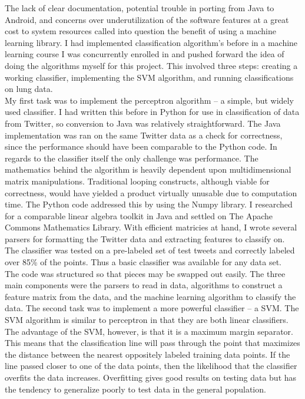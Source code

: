 \documentclass{article}
\begin{document}
 The lack of clear documentation, potential trouble in porting from Java to Android, and concerns over underutilization of the software features at a great cost to system resources called into question the benefit of using a machine learning library. I had implemented classification algorithm’s before in a machine learning course I was concurrently enrolled in and pushed forward the idea of doing the algorithms myself for this project. This involved three steps: creating a working classifier, implementing the SVM algorithm, and running classifications on lung data.\\
 
 My first task was to implement the perceptron algorithm – a simple, but widely used classifier. I had written this before in Python for use in classification of data from Twitter, so conversion to Java was relatively straightforward. The Java implementation was ran on the same Twitter data as a check for correctness, since the performance should have been comparable to the Python code. In regards to the classifier itself the only challenge was performance. The mathematics behind the algorithm is heavily dependent upon multidimensional matrix manipulations. Traditional looping constructs, although viable for correctness, would have yielded a product virtually unusable due to computation time. The Python code addressed this by using the Numpy library. I researched for a comparable linear algebra toolkit in Java and settled on The Apache Commons Mathematics Library. With efficient matricies at hand, I wrote several parsers for formatting the Twitter data and extracting features to classify on. The classifier was tested on a pre-labeled set of test tweets and correctly labeled over 85\% of the points. Thus a basic classifier was available for any data set.\\
 
 The code was structured so that pieces may be swapped out easily. The three main components were the parsers to read in data, algorithms to construct a feature matrix from the data, and the machine learning algorithm to classify the data. The second task was to implement a more powerful classifier – a SVM. The SVM algorithm is similar to perceptron in that they are both linear classifiers. The advantage of the SVM, however, is that it is a maximum margin separator. This means that the classification line will pass through the point that maximizes the distance between the nearest oppositely labeled training data points. If the line passed closer to one of the data points, then the likelihood that the classifier overfits the data increases. Overfitting gives good results on testing data but has the tendency to generalize poorly to test data in the general population.\\
 
\end{document}
